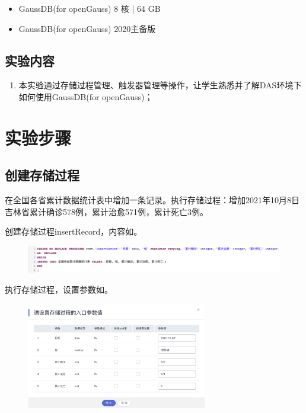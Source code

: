 \documentclass[lang=cn,11pt,a4paper,cite=authornum]{paper}
\begin{document}
\begin{itemize}
    \item GaussDB(for openGauss) 8 核 | 64 GB
    \item GaussDB(for openGauss) 2020主备版
\end{itemize}

\subsection{实验内容}

\begin{enumerate}
    \item 本实验通过存储过程管理、触发器管理等操作，让学生熟悉并了解DAS环境下如何使用GaussDB(for openGauss)；
\end{enumerate}

\section{实验步骤}

\subsection{创建存储过程}

在全国各省累计数据统计表中增加一条记录。执行存储过程：增加2021年10月8日吉林省累计确诊578例，累计治愈571例，累计死亡3例。

创建存储过程insertRecord，内容如。
\begin{figure}[!htb]
    \centering
    \includegraphics[width=\textwidth]{./images/res25.png}
    \caption{\label{fig:res25}}
\end{figure}

执行存储过程，设置参数如。
\begin{figure}[!htb]
    \centering
    \includegraphics[width=0.7\textwidth]{./images/res26.png}
    \caption{\label{fig:res26}}
\end{figure}
\end{document}
